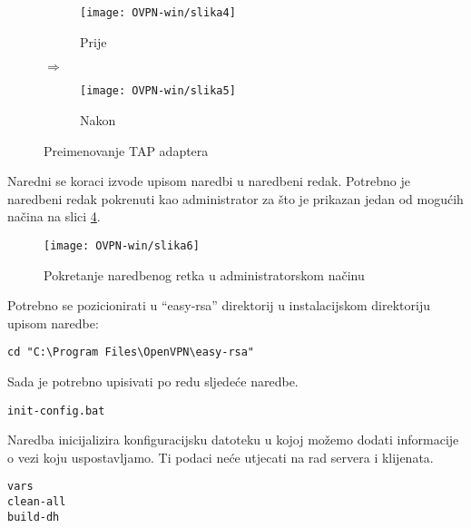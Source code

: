 \begin{figure}[h!]
    \centering
    \begin{subfigure}[b]{0.35\textwidth}
        \texttt{[image: OVPN-win/slika4]}
        \caption{Prije}
        \label{fig:prije}
    \end{subfigure}
    $\Longrightarrow$
    \begin{subfigure}[b]{0.35\textwidth}
        \texttt{[image: OVPN-win/slika5]}
        \caption{Nakon}
        \label{fig:nakon}
    \end{subfigure}
    \caption{Preimenovanje TAP adaptera}
\end{figure}
\FloatBarrier

Naredni se koraci izvode upisom naredbi u naredbeni redak. Potrebno je naredbeni redak pokrenuti kao administrator za što je prikazan jedan od mogućih načina na slici \ref{fig:administrator-win}.

\begin{figure}[h!]
	\centering
     \texttt{[image: OVPN-win/slika6]}
     \caption{Pokretanje naredbenog retka u administratorskom načinu}
     \label{fig:administrator-win}
\end{figure}
\FloatBarrier

Potrebno se pozicionirati u ``easy-rsa'' direktorij u instalacijskom direktoriju upisom naredbe:
\begin{lstlisting}
cd "C:\Program Files\OpenVPN\easy-rsa"
\end{lstlisting}
Sada je potrebno upisivati po redu sljedeće naredbe.
\begin{lstlisting}
init-config.bat
\end{lstlisting}
Naredba inicijalizira konfiguracijsku datoteku u kojoj možemo dodati informacije o vezi koju uspostavljamo. Ti podaci neće utjecati na rad servera i klijenata.
\begin{lstlisting}
vars
clean-all
build-dh
\end{lstlisting}

